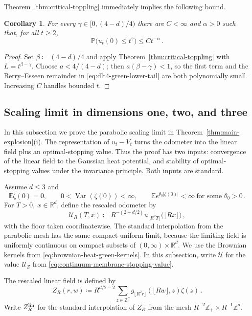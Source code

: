 \documentclass[11pt]{amsart}
\theoremstyle{plain}
\newtheorem{corollary}[theorem]{Corollary}
\theoremstyle{definition}
\newcommand{\Z}{\mathbb{Z}}
\newcommand{\R}{\mathbb{R}}
\newcommand{\E}{\mathbb{E}}
\renewcommand{\P}{\mathbb{P}}
\DeclareMathOperator{\Var}{Var}
\begin{document}
Theorem~\ref{thm:critical-toppling} immediately implies the following bound.

\begin{corollary}\label{cor:critical-mean-one}
	For every $\gamma\in[0,(4-d)/4)$ there are $C<\infty$ and $\alpha>0$
	such that, for all $t\geq2$,
	\[
		\P\bigl(u_t(0)\leq t^\gamma\bigr)\leq Ct^{-\alpha}\, .
	\]
\end{corollary}

\begin{proof}
	Set $\beta\coloneqq(4-d)/4$ and apply
	Theorem~\ref{thm:critical-toppling} with $L=t^{\beta-\gamma}$.
	Choose $a<4/(4-d)$; then $a(\beta-\gamma)<1$, so the first term and the
	Berry--Esseen remainder in \eqref{eq:dlt4-green-lower-tail} are both
	polynomially small. Increasing $C$ handles bounded $t$.
\end{proof}

\subsection{Scaling limit in dimensions one, two, and three}\label{ssec:scaling-dlt4}

	In this subsection we prove the parabolic scaling limit in
	Theorem~\ref{thm:main-explosion}(i). The representation of $u_t-V_t$
	turns the odometer into the linear field plus an optimal-stopping value.
	Thus the proof has two inputs: convergence of the linear field to the
	Gaussian heat potential, and stability of optimal-stopping values under the
	invariance principle. Both inputs are standard. 

	Assume $d\leq3$ and
	\[
		\E\zeta(0)=0 ,\qquad 0<\Var(\zeta(0))<\infty,\qquad \E e^{\theta_0|\zeta(0)|}<\infty\ \text{for some }\theta_0>0\, .
	\]
	For $T>0,\ x\in\R^d$, define the rescaled odometer by
	\[
		\mathcal U_R(T,x)\coloneqq R^{-(2-d/2)} u_{\lfloor R^2T\rfloor}\bigl(\lfloor Rx\rfloor\bigr)\, ,
	\]
	with the floor taken coordinatewise. The standard interpolation from the
	parabolic mesh has the same compact-uniform limit, because the limiting
	field is uniformly continuous on compact subsets of $(0,\infty)\times\R^d$.
	We use the Brownian kernels from \eqref{eq:brownian-heat-green-kernels}.
	In this subsection, write $\mathcal U$ for the value $\mathcal U_Z$ from
	\eqref{eq:continuum-membrane-stopping-value}.

	The rescaled linear field is defined by
	\[
		Z_R(r,w)
		\coloneqq
		R^{d/2-2}\sum_{z\in\Z^d} g_{\lfloor R^2r\rfloor}(\lfloor Rw\rfloor,z)\zeta(z)\, .
	\]
	Write $Z_R^{\rm lin}$ for the standard interpolation of $Z_R$ from the mesh
	$R^{-2}\Z_+\times R^{-1}\Z^d$.
\end{document}
